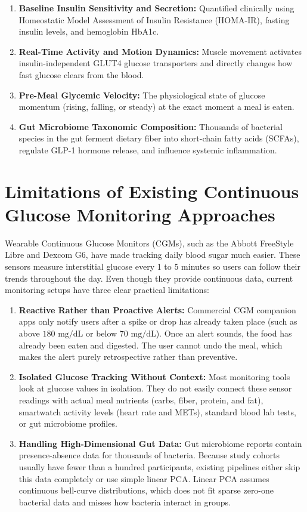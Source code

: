 \begin{enumerate}
    \item \textbf{Baseline Insulin Sensitivity and Secretion:} Quantified clinically using Homeostatic Model Assessment of Insulin Resistance (HOMA-IR), fasting insulin levels, and hemoglobin HbA1c.
    \item \textbf{Real-Time Activity and Motion Dynamics:} Muscle movement activates insulin-independent GLUT4 glucose transporters and directly changes how fast glucose clears from the blood.
    \item \textbf{Pre-Meal Glycemic Velocity:} The physiological state of glucose momentum (rising, falling, or steady) at the exact moment a meal is eaten.
    \item \textbf{Gut Microbiome Taxonomic Composition:} Thousands of bacterial species in the gut ferment dietary fiber into short-chain fatty acids (SCFAs), regulate GLP-1 hormone release, and influence systemic inflammation.
\end{enumerate}

\section{Limitations of Existing Continuous Glucose Monitoring Approaches}
Wearable Continuous Glucose Monitors (CGMs), such as the Abbott FreeStyle Libre and Dexcom G6, have made tracking daily blood sugar much easier. These sensors measure interstitial glucose every 1 to 5 minutes so users can follow their trends throughout the day. Even though they provide continuous data, current monitoring setups have three clear practical limitations:

\begin{enumerate}
    \item \textbf{Reactive Rather than Proactive Alerts:} Commercial CGM companion apps only notify users after a spike or drop has already taken place (such as above $180\text{ mg/dL}$ or below $70\text{ mg/dL}$). Once an alert sounds, the food has already been eaten and digested. The user cannot undo the meal, which makes the alert purely retrospective rather than preventive.
    \item \textbf{Isolated Glucose Tracking Without Context:} Most monitoring tools look at glucose values in isolation. They do not easily connect these sensor readings with actual meal nutrients (carbs, fiber, protein, and fat), smartwatch activity levels (heart rate and METs), standard blood lab tests, or gut microbiome profiles.
    \item \textbf{Handling High-Dimensional Gut Data:} Gut microbiome reports contain presence-absence data for thousands of bacteria. Because study cohorts usually have fewer than a hundred participants, existing pipelines either skip this data completely or use simple linear PCA. Linear PCA assumes continuous bell-curve distributions, which does not fit sparse zero-one bacterial data and misses how bacteria interact in groups.
\end{enumerate}

